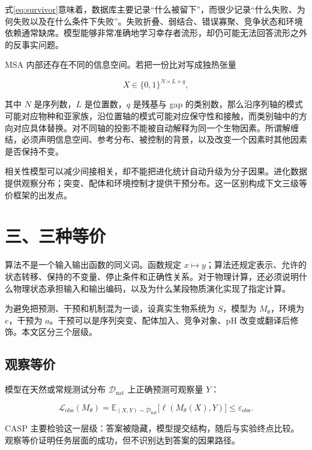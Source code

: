 \documentclass[10pt]{article}
\begin{document}
式\eqref{eq:survivor}意味着，数据库主要记录“什么被留下”，而很少记录“什么失败、为何失败以及在什么条件下失败”。失败折叠、弱结合、错误寡聚、竞争状态和环境依赖通常缺席。模型能够非常准确地学习幸存者流形，却仍可能无法回答流形之外的反事实问题。

MSA 内部还存在不同的信息空间。若把一份比对写成独热张量

\begin{equation}
X\in\{0,1\}^{N\times L\times q},
\label{eq:msa_tensor}
\end{equation}

其中 $N$ 是序列数，$L$ 是位置数，$q$ 是残基与 gap 的类别数，那么沿序列轴的模式可能对应物种和亚家族，沿位置轴的模式可能对应保守性和接触，而类别轴中的方向对应具体替换。对不同轴的投影不能被自动解释为同一个生物因素。所谓解缠结，必须声明信息空间、参考分布、被控制的背景，以及改变一个因素时其他因素是否保持不变。

相关性模型可以减少间接相关，却不能把进化统计自动升级为分子因果。进化数据提供观察分布；突变、配体和环境控制才提供干预分布。这一区别构成下文三级等价框架的出发点。

\section*{三、三种等价}

算法不是一个输入输出函数的同义词。函数规定 $x\mapsto y$；算法还规定表示、允许的状态转移、保持的不变量、停止条件和正确性关系。对于物理计算，还必须说明什么物理状态承担输入和输出编码，以及为什么某段物质演化实现了指定计算\cite{piccinini2015}。

为避免把预测、干预和机制混为一谈，设真实生物系统为 $S$，模型为 $M_\theta$，环境为 $e$，干预为 $a$。干预可以是序列突变、配体加入、竞争对象、pH 改变或翻译后修饰。本文区分三个层级。

\subsection*{观察等价}

模型在天然或常规测试分布 $\mathcal D_{\mathrm{nat}}$ 上正确预测可观察量 $Y$：

\begin{equation}
\mathcal L_{\mathrm{obs}}(M_\theta)
=
\mathbb E_{(X,Y)\sim\mathcal D_{\mathrm{nat}}}
\bigl[\ell(M_\theta(X),Y)\bigr]
\leq \varepsilon_{\mathrm{obs}}.
\label{eq:obs}
\end{equation}

CASP 主要检验这一层级：答案被隐藏，模型提交结构，随后与实验终点比较\cite{moult1995,jumper2021}。观察等价证明任务层面的成功，但不识别达到答案的因果路径。
\end{document}
